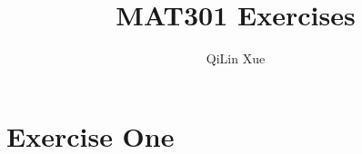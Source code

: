 \documentclass{article}
\title{MAT301 Exercises}
\author{QiLin Xue}
\date{}
\begin{document}
\maketitle

\section{Exercise One}











\end{document}
